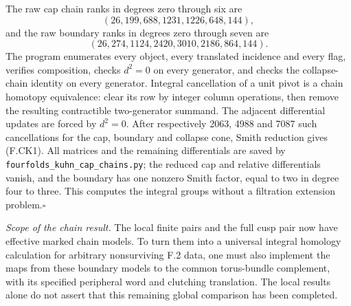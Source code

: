 The raw cap chain ranks in degrees zero through six are
\[
 (26,199,688,1231,1226,648,144),
\]
and the raw boundary ranks in degrees zero through seven are
\[
 (26,274,1124,2420,3010,2186,864,144).
\]
The program enumerates every object, every translated
incidence and every flag, verifies composition, checks
$d^2=0$ on every generator, and checks the collapse-chain
identity on every generator.  Integral cancellation of a
unit pivot is a chain homotopy equivalence: clear its row by
integer column operations, then remove the resulting
contractible two-generator summand.  The adjacent differential
updates are forced by $d^2=0$.  After respectively 2063,
4988 and 7087 such cancellations for the cap, boundary and
collapse cone, Smith reduction gives (F.CK1).  All matrices
and the remaining differentials are saved by
\texttt{fourfolds\_kuhn\_cap\_chains.py}; the reduced cap and
relative differentials vanish, and the boundary has one
nonzero Smith factor, equal to two in degree four to three.
This computes the integral groups without a filtration
extension problem.\hfill$\square$

\emph{Scope of the chain result.}
The local finite pairs and the full cusp pair now have
effective marked chain models.  To turn them into a universal
integral homology calculation for arbitrary nonsurviving F.2
data, one must also implement the maps from these boundary
models to the common torus-bundle complement, with its
specified peripheral word and clutching translation.  The
local results alone do not assert that this remaining global
comparison has been completed.
